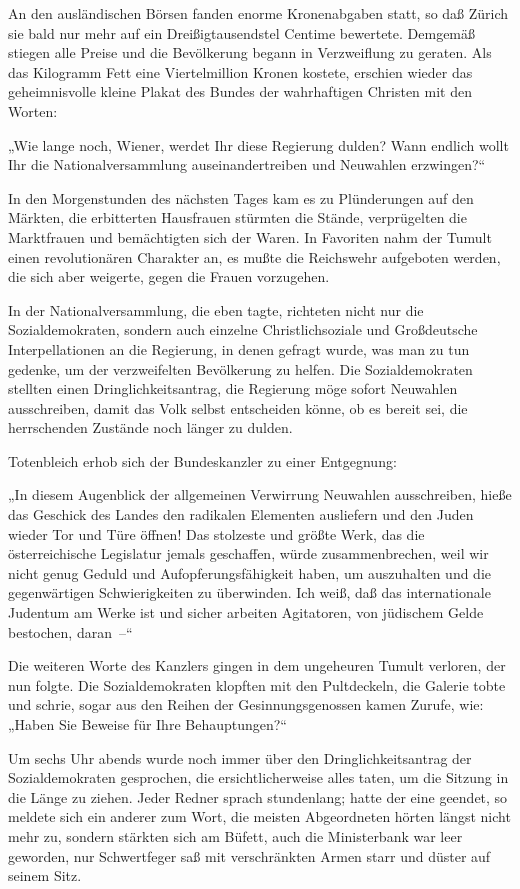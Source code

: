 An den ausländischen Börsen fanden enorme Kronenabgaben statt, so
daß Zürich sie bald nur mehr auf ein Dreißigtausendstel Centime
bewertete. Demgemäß stiegen alle Preise und die Bevölkerung begann
in Verzweiflung zu geraten. Als das Kilogramm Fett eine
Viertelmillion Kronen kostete, erschien wieder das geheimnisvolle
kleine Plakat des Bundes der wahrhaftigen Christen mit den Worten:

„Wie lange noch, Wiener, werdet Ihr diese Regierung dulden? Wann
endlich wollt Ihr die Nationalversammlung auseinandertreiben und
Neuwahlen erzwingen?“

In den Morgenstunden des nächsten Tages kam es zu Plünderungen auf
den Märkten, die erbitterten Hausfrauen stürmten die Stände,
verprügelten die Marktfrauen und bemächtigten sich der Waren. In
Favoriten nahm der Tumult einen revolutionären Charakter an, es
mußte die Reichswehr aufgeboten werden, die sich aber weigerte,
gegen die Frauen vorzugehen.

In der Nationalversammlung, die eben tagte, richteten nicht nur die
Sozialdemokraten, sondern auch einzelne Christlichsoziale und
Großdeutsche Interpellationen an die Regierung, in denen gefragt
wurde, was man zu tun gedenke, um der verzweifelten Bevölkerung zu
helfen. Die Sozialdemokraten stellten einen Dringlichkeitsantrag,
die Regierung möge sofort Neuwahlen ausschreiben, damit das
 Volk selbst entscheiden könne, ob es bereit sei,
die herrschenden Zustände noch länger zu dulden.

Totenbleich erhob sich der Bundeskanzler zu einer Entgegnung:

„In diesem Augenblick der allgemeinen Verwirrung Neuwahlen
ausschreiben, hieße das Geschick des Landes den radikalen Elementen
ausliefern und den Juden wieder Tor und Türe öffnen! Das stolzeste
und größte Werk, das die österreichische Legislatur jemals
geschaffen, würde zusammenbrechen, weil wir nicht genug Geduld und
Aufopferungsfähigkeit haben, um auszuhalten und die gegenwärtigen
Schwierigkeiten zu überwinden. Ich weiß, daß das internationale
Judentum am Werke ist und sicher arbeiten Agitatoren, von jüdischem
Gelde bestochen, daran~–“

Die weiteren Worte des Kanzlers gingen in dem ungeheuren Tumult
verloren, der nun folgte. Die Sozialdemokraten klopften mit den
Pultdeckeln, die Galerie tobte und schrie, sogar aus den Reihen der
Gesinnungsgenossen kamen Zurufe, wie: „Haben Sie Beweise für Ihre
Behauptungen?“

Um sechs Uhr abends wurde noch immer über den Dringlichkeitsantrag
der Sozialdemokraten gesprochen, die ersichtlicherweise alles
taten, um die Sitzung in die Länge zu ziehen. Jeder Redner sprach
stundenlang; hatte der eine geendet, so meldete sich ein anderer
zum Wort, die meisten Abgeordneten hörten längst nicht mehr zu,
sondern stärkten sich am Büfett, auch die Ministerbank war leer
geworden, nur Schwertfeger saß mit verschränkten Armen starr und
düster auf seinem Sitz.

